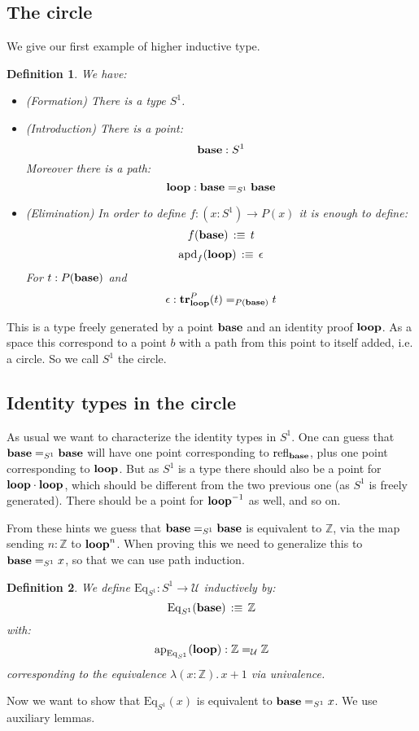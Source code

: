 \documentclass{article}
\newcommand{\sse}[1]{\medbreak \subsection{#1}}
\newcommand{\U}{{\mathcal U}}
\renewcommand{\r}{\rightarrow}
\newcommand{\Gl}{\lambda}
\newcommand{\ap}{\mathrm{ap}}
\newcommand{\apd}{\mathrm{apd}}
\newcommand{\refl}{\mathrm{refl}}
\newcommand{\tr}{\mathrm{\bf tr}}
\newcommand{\base}{\mathrm{\bf base}}
\renewcommand{\loop}{\mathrm{\bf loop}}
\newcommand{\Eq}{\mathrm{Eq}}
\newtheorem{definition}{Definition}
\begin{document}
\sse{The circle}

We give our first example of higher inductive type.

\begin{definition}
We have:
\begin{itemize}
\item (Formation) There is a type $S^1$.
\item (Introduction) There is a point: \[\base : S^1\] 
Moreover there is a path: \[\loop : \base=_{S^1}\base\]
\item (Elimination) In order to define $f:(x:S^1) \r P(x)$ it is enough to define:
\[f(\base) \, :\equiv\, t \]
\[\apd_f(\loop) \, :\equiv\, \epsilon\]
For $t:P(\base)$ and 
\[\epsilon : \tr^P_\loop(t) =_{P(\base)} t\]%
\end{itemize}
\end{definition}

This is a type freely generated by a point $\base$ and an identity proof $\loop$. As a space this correspond to a point $b$ with a path from this point to itself added, i.e. a circle. So we call $S^1$ the circle. 

\sse{Identity types in the circle}

As usual we want to characterize the identity types in $S^1$. One can guess that $\base=_{S^1}\base$ will have one point corresponding to $\refl_\base$, plus one point corresponding to $\loop$. But as $S^1$ is a type there should also be a point for $\loop\cdot\loop$, which should be different from the two previous one (as $S^1$ is freely generated). There should be a point for $\loop^{-1}$ as well, and so on.

From these hints we guess that $\base=_{S^1}\base$ is equivalent to $\mathbb{Z}$, via the map sending $n:\mathbb{Z}$ to $\loop^n$. When proving this we need to generalize this to $\base=_{S^1}x$, so that we can use path induction.

\begin{definition}
We define $\Eq_{S^1} : S^1 \r \U$ inductively by:
\[\Eq_{S^1}(\base) \, :\equiv\, \mathbb{Z}\]
with: 
\[\ap_{\Eq_{S^1}}(\loop) : \mathbb{Z}=_\U\mathbb{Z}\] 
corresponding to the equivalence $\Gl(x:\mathbb{Z}).\, x+1$ via univalence.
\end{definition} 

Now we want to show that $\Eq_{S^1}(x)$ is equivalent to $\base=_{S^1}x$. We use auxiliary lemmas.
\end{document}
